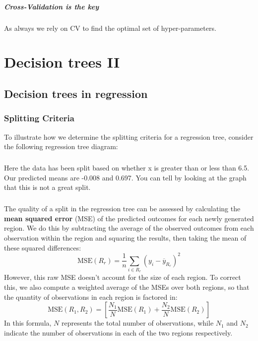 \documentclass[11pt,a4paper]{report}
\begin{document}
\paragraph{Cross-Validation is the key} As always we rely on CV to find the optimal set of hyper-parameters.
\pagebreak
\chapter{Decision trees II}
\section{Decision trees in regression}
\subsection{Splitting Criteria}
To illustrate how we determine the splitting criteria for a regression tree, consider the following regression tree diagram:\\
\paragraph{}Here the data has been split based on whether x is greater than or less than 6.5. Our predicted means are -0.008 and 0.697. You can tell by looking at the graph that this is not a great split.
\paragraph{}The quality of a split in the regression tree can be assessed by calculating the \textbf{mean squared error} (MSE) of the predicted outcomes for each newly generated region. We do this by subtracting the average of the observed outcomes from each observation within the region and squaring the results, then taking the mean of these squared differences:
$$\textrm{MSE}(R_r)=\frac{1}{n}\sum_{i\in R_r} (y_i-\overline{y}_{R_r})^2$$
However, this raw MSE doesn't account for the size of each region. To correct this, we also compute a weighted average of the MSEs over both regions, so that the quantity of observations in each region is factored in:
$$\textrm{MSE}(R_1,R_2) = \left[\frac{N_1}{N}\textrm{MSE}(R_1)+\frac{N_2}{N}\textrm{MSE}(R_2)\right]$$
In this formula, $N$ represents the total number of observations, while $N_1$ and $N_2	$ indicate the number of observations in each of the two regions respectively.
\end{document}
